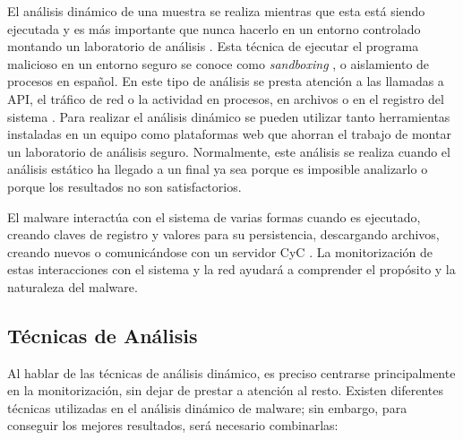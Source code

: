 \noindent El análisis dinámico de una muestra se realiza mientras que esta está siendo ejecutada y es más importante que nunca hacerlo en un entorno controlado montando un laboratorio de análisis \cite{111}.  Esta técnica de ejecutar el programa malicioso en un entorno seguro se conoce como \textit{sandboxing} \cite{122}, o aislamiento de procesos en español.  En este tipo de análisis se presta atención a las llamadas a \gls{API}, el tráfico de red o la actividad en procesos, en archivos o en el registro del sistema \cite{Gandotra2014}.
Para realizar el análisis dinámico se pueden utilizar tanto herramientas instaladas en un equipo como plataformas web que ahorran el trabajo de montar un laboratorio de análisis seguro. Normalmente, este análisis se realiza cuando el análisis estático ha llegado a un final ya sea porque es imposible analizarlo o porque los resultados no son satisfactorios.

El malware interactúa con el sistema de varias formas cuando es ejecutado, creando claves de registro y valores para su persistencia, descargando archivos, creando nuevos o comunicándose con un servidor \gls{CyC} \cite{123}. La monitorización de estas interacciones con el sistema y la red ayudará a comprender el propósito y la naturaleza del malware. 

\subsection{Técnicas de Análisis}

\noindent Al hablar de las técnicas de análisis dinámico, es preciso centrarse principalmente en la monitorización, sin dejar de prestar a atención al resto. 
Existen diferentes técnicas utilizadas en el análisis dinámico de malware; sin embargo, para conseguir los mejores resultados, será necesario combinarlas:

